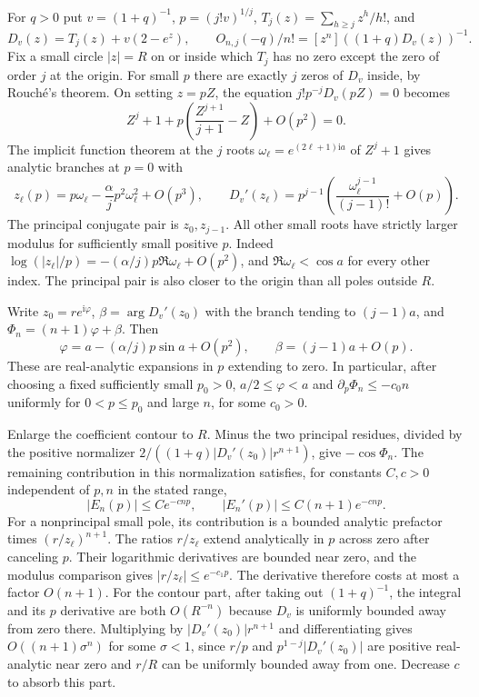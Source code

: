 \documentclass[11pt]{article}
\begin{document}
For $q>0$ put $v=(1+q)^{-1}$, $p=(j!v)^{1/j}$, $T_j(z)=\sum_{h\ge j}z^h/h!$, and
\[
D_v(z)=T_j(z)+v(2-e^z),\qquad O_{n,j}(-q)/n!=[z^n]((1+q)D_v(z))^{-1}.
\]
Fix a small circle $|z|=R$ on or inside which $T_j$ has no zero except the zero of order $j$ at the origin. For small $p$ there are exactly $j$ zeros of $D_v$ inside, by Rouch\'{e}'s theorem. On setting $z=pZ$, the equation $j!p^{-j}D_v(pZ)=0$ becomes
\[
Z^j+1+p\left(\frac{Z^{j+1}}{j+1}-Z\right)+O(p^2)=0.
\]
The implicit function theorem at the $j$ roots $\omega_\ell=e^{(2\ell+1)\mathrm{i}a}$ of $Z^j+1$ gives analytic branches at $p=0$ with
\[
z_\ell(p)=p\omega_\ell-\frac{\alpha}{j}p^2\omega_\ell^2+O(p^3),\qquad
D_v'(z_\ell)=p^{j-1}\left(\frac{\omega_\ell^{j-1}}{(j-1)!}+O(p)\right).
\]
The principal conjugate pair is $z_0,z_{j-1}$. All other small roots have strictly larger modulus for sufficiently small positive $p$. Indeed $\log(|z_\ell|/p)=-(\alpha/j)p\Re\omega_\ell+O(p^2)$, and $\Re\omega_\ell<\cos a$ for every other index. The principal pair is also closer to the origin than all poles outside $R$.

Write $z_0=r e^{\mathrm{i}\varphi}$, $\beta=\arg D_v'(z_0)$ with the branch tending to $(j-1)a$, and $\Phi_n=(n+1)\varphi+\beta$. Then
\[
\varphi=a-(\alpha/j)p\sin a+O(p^2),
\qquad \beta=(j-1)a+O(p).
\]
These are real-analytic expansions in $p$ extending to zero. In particular, after choosing a fixed sufficiently small $p_0>0$, $a/2\le\varphi<a$ and $\partial_p\Phi_n\le-c_0 n$ uniformly for $0<p\le p_0$ and large $n$, for some $c_0>0$.

Enlarge the coefficient contour to $R$. Minus the two principal residues, divided by the positive normalizer $2/((1+q)|D_v'(z_0)|r^{n+1})$, give $-\cos\Phi_n$. The remaining contribution in this normalization satisfies, for constants $C,c>0$ independent of $p,n$ in the stated range,
\[
|E_n(p)|\le C e^{-c n p},\qquad |E_n'(p)|\le C(n+1)e^{-c n p}.
\]
For a nonprincipal small pole, its contribution is a bounded analytic prefactor times $(r/z_\ell)^{n+1}$. The ratios $r/z_\ell$ extend analytically in $p$ across zero after canceling $p$. Their logarithmic derivatives are bounded near zero, and the modulus comparison gives $|r/z_\ell|\le e^{-c_1 p}$. The derivative therefore costs at most a factor $O(n+1)$. For the contour part, after taking out $(1+q)^{-1}$, the integral and its $p$ derivative are both $O(R^{-n})$ because $D_v$ is uniformly bounded away from zero there. Multiplying by $|D_v'(z_0)|r^{n+1}$ and differentiating gives $O((n+1)\sigma^n)$ for some $\sigma<1$, since $r/p$ and $p^{1-j}|D_v'(z_0)|$ are positive real-analytic near zero and $r/R$ can be uniformly bounded away from one. Decrease $c$ to absorb this part.
\end{document}
